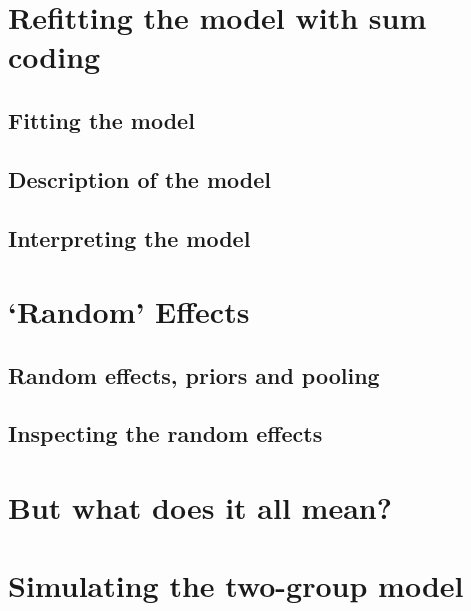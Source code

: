 \documentclass[
]{book}
\begin{document}
\hypertarget{refitting-the-model-with-sum-coding}{%
\section{Refitting the model with sum coding}\label{refitting-the-model-with-sum-coding}}

\hypertarget{fitting-the-model-2}{%
\subsection{Fitting the model}\label{fitting-the-model-2}}

\hypertarget{description-of-the-model-2}{%
\subsection{Description of the model}\label{description-of-the-model-2}}

\hypertarget{interpreting-the-model-1}{%
\subsection{Interpreting the model}\label{interpreting-the-model-1}}

\hypertarget{random-effects}{%
\section{`Random' Effects}\label{random-effects}}

\hypertarget{random-effects-priors-and-pooling}{%
\subsection{Random effects, priors and pooling}\label{random-effects-priors-and-pooling}}

\hypertarget{inspecting-the-random-effects}{%
\subsection{Inspecting the random effects}\label{inspecting-the-random-effects}}

\hypertarget{but-what-does-it-all-mean}{%
\section{But what does it all mean?}\label{but-what-does-it-all-mean}}

\hypertarget{simulating-the-two-group-model}{%
\section{Simulating the two-group model}\label{simulating-the-two-group-model}}
\end{document}
